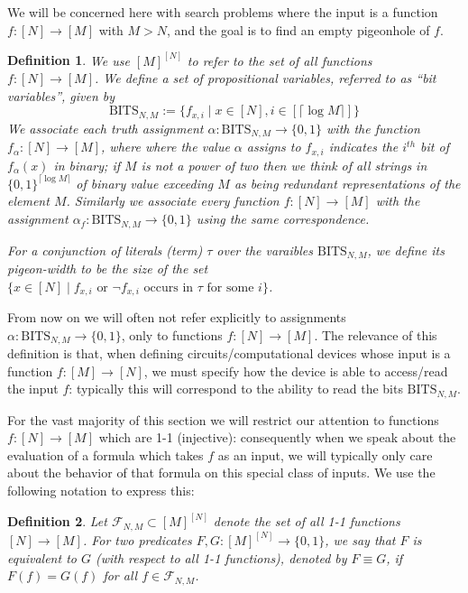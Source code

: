 \documentclass[11pt]{article}
\newtheorem{definition}{Definition}
\newcommand{\B}{\{0,1\}}
\begin{document}
We will be concerned here with search problems where the input is a function $f: [N] \to [M]$ with $M > N$, and the goal is to find an empty pigeonhole of $f$. 
\begin{definition}
We use $[M]^{[N]}$ to refer to the set of all functions $f: [N] \to [M]$.
We define a set of propositional variables, referred to as ``bit variables'', given by 
\[
\mathrm{BITS}_{N,M}:=\{f_{x,i} \mid x \in [N], i \in [\lceil \log M \rceil]\}
\] We associate each truth assignment $\alpha: \mathrm{BITS}_{N,M} \to \B$ with the function $f_{\alpha}: [N] \to [M]$, where where the value $\alpha$ assigns to $f_{x,i}$ indicates the $i^{th}$ bit of $f_{\alpha}(x)$ in binary; if $M$ is not a power of two then we think of all strings in $\B^{\lceil \log M \rceil}$ of binary value exceeding $M$ as being redundant representations of the element $M$. Similarly we associate every function $f: [N] \to [M]$ with the assignment $\alpha_f: \mathrm{BITS}_{N,M} \to \B$ using the same correspondence. 

For a conjunction of literals (term) $\tau$ over the varaibles $\mathrm{BITS}_{N,M}$, we define its \emph{pigeon-width} to be the size of the set $\{x \in [N]\mid  f_{x,i} \text{ or } \lnot f_{x,i} \text{ occurs in } \tau \text{ for some } i \}$.
\end{definition}
From now on we will often not refer explicitly to assignments $\alpha: \mathrm{BITS}_{N,M} \to \B$, only to functions $f: [N] \to [M]$. 
The relevance of this definition is that, when defining circuits/computational devices whose input is a function $f: [M] \to [N]$, we must specify how the device is able to access/read the input $f$: typically this will correspond to the ability to read the bits $\mathrm{BITS}_{N,M}$.

For the vast majority of this section we will restrict our attention to functions $f: [N] \to [M]$ which are 1-1 (injective): consequently when we speak about the evaluation of a formula which takes $f$ as an input, we will typically only care about the behavior of that formula on this special class of inputs. We use the following notation to express this:
\begin{definition}
Let $\mathcal{F}_{N,M} \subset [M]^{[N]}$ denote the set of all 1-1 functions $[N] \to [M]$. For two predicates $F,G:[M]^{[N]}\to \B$, we say that $F$ is equivalent to $G$ (with respect to all 1-1 functions), denoted by  $F \equiv G$, if $F(f)=G(f)$ for all $f \in \mathcal{F}_{N,M}$.
\end{definition}
\end{document}
